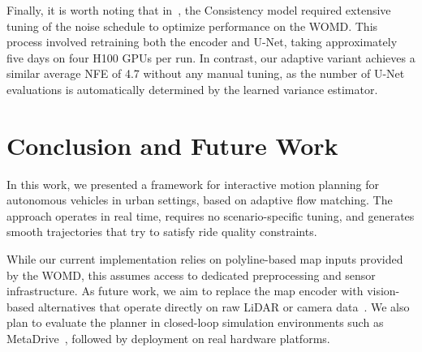 \documentclass[conference]{IEEEtran}
\begin{document}
Finally, it is worth noting that in~\cite{consistency_model_hri}, the Consistency model required extensive tuning of the noise schedule to optimize performance on the WOMD. This process involved retraining both the encoder and U-Net, taking approximately five days on four H100 GPUs per run. In contrast, our adaptive variant achieves a similar average NFE of 4.7 without any manual tuning, as the number of U-Net evaluations is automatically determined by the learned variance estimator.


\section{Conclusion and Future Work}

In this work, we presented a framework for interactive motion planning for autonomous vehicles in urban settings, based on adaptive flow matching. The approach operates in real time, requires no scenario-specific tuning, and generates smooth trajectories that try to satisfy ride quality constraints.

While our current implementation relies on polyline-based map inputs provided by the WOMD, this assumes access to dedicated preprocessing and sensor infrastructure. As future work, we aim to replace the map encoder with vision-based alternatives that operate directly on raw LiDAR or camera data~\cite{vision_encoder}. We also plan to evaluate the planner in closed-loop simulation environments such as MetaDrive~\cite{metadrive}, followed by deployment on real hardware platforms.



% 










\end{document}
